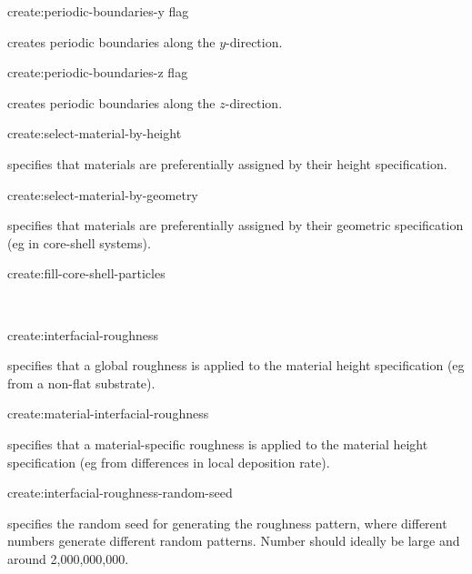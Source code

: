 {\zicf create:periodic-boundaries-y flag} creates periodic boundaries along the $y$-direction.\\ \par

{\zicf create:periodic-boundaries-z flag} creates periodic boundaries along the $z$-direction.\\ \par

{\zicf create:select-material-by-height} specifies that materials are preferentially assigned by their height specification.\\ \par

{\zicf create:select-material-by-geometry} specifies that materials are preferentially assigned by their geometric specification (eg in core-shell systems).\\ \par

{\zicf create:fill-core-shell-particles}\\ \par

{\zicf create:interfacial-roughness} specifies that a global roughness is applied to the material height specification (eg from a non-flat substrate).\\ \par

{\zicf create:material-interfacial-roughness} specifies that a material-specific roughness is applied to the material height specification (eg from differences in local deposition rate).\\ \par

{\zicf create:interfacial-roughness-random-seed} specifies the random seed for generating the roughness pattern, where different numbers generate different random patterns. Number should ideally be large and around 2,000,000,000.\\ \par

